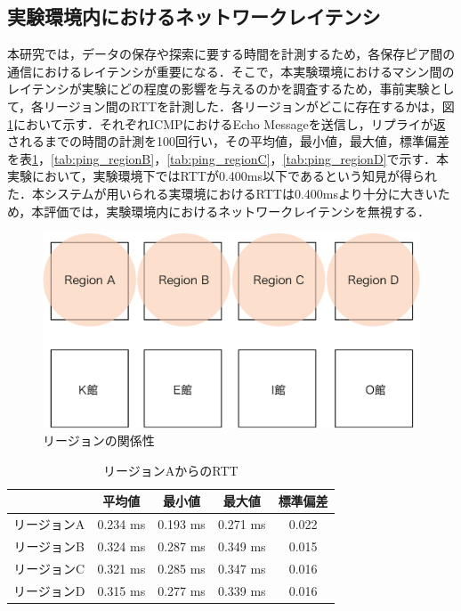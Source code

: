 \subsection{実験環境内におけるネットワークレイテンシ}
本研究では，データの保存や探索に要する時間を計測するため，各保存ピア間の通信におけるレイテンシが重要になる．そこで，本実験環境におけるマシン間のレイテンシが実験にどの程度の影響を与えるのかを調査するため，事前実験として，各リージョン間のRTTを計測した．各リージョンがどこに存在するかは，図\ref{fig:region}において示す．それぞれICMPにおけるEcho Messageを送信し，リプライが返されるまでの時間の計測を100回行い，その平均値，最小値，最大値，標準偏差を表\ref{tab:ping_regionA}，\ref{tab:ping_regionB}，\ref{tab:ping_regionC}，\ref{tab:ping_regionD}で示す．本実験において，実験環境下ではRTTが0.400ms以下であるという知見が得られた．本システムが用いられる実環境におけるRTTは0.400msより十分に大きいため，本評価では，実験環境内におけるネットワークレイテンシを無視する．


 \begin{figure}[htbp]
  \begin{center}
   \includegraphics[width=140mm]{./images/region.eps}
  \end{center}
  \caption{リージョンの関係性}
  \label{fig:region}
\end{figure}

\begin{table}[htb]
  \centering
  \caption{リージョンAからのRTT}
  \begin{tabular}{|c||c|c|c|c|} \hline
    \backslashbox{}{} & 平均値 & 最小値 & 最大値 & 標準偏差 \\ \hline \hline
    リージョンA & 0.234 ms & 0.193 ms & 0.271 ms & 0.022 \\ \hline
    リージョンB & 0.324 ms & 0.287 ms & 0.349 ms & 0.015 \\ \hline
    リージョンC & 0.321 ms & 0.285 ms & 0.347 ms & 0.016 \\ \hline
    リージョンD & 0.315 ms & 0.277 ms & 0.339 ms & 0.016 \\ \hline
  \end{tabular}
  \label{tab:ping_regionA}
\end{table}

